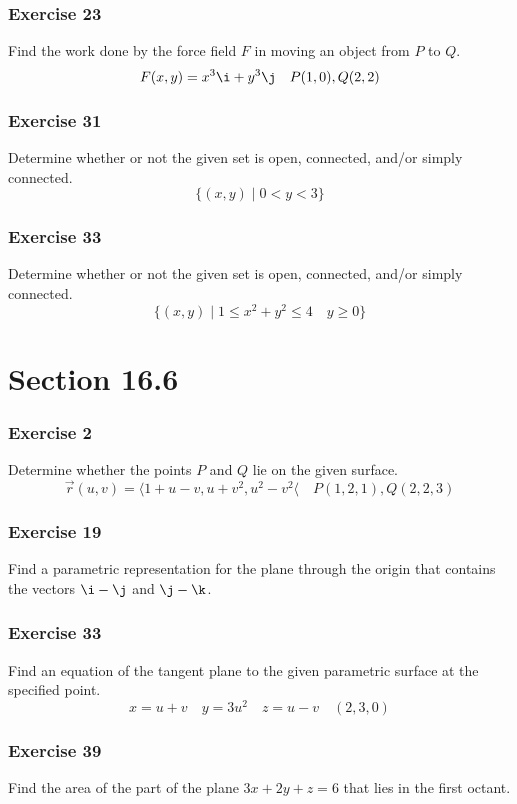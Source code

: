 \documentclass{math}
\begin{document}
\subsubsection*{Exercise 23}
Find the work done by the force field \( F \) in moving an object from \( P \)
to \( Q \).
\[ F(x,y) = x^3\i+y^3\j \quad P(1,0),Q(2,2) \]

\subsubsection*{Exercise 31}
Determine whether or not the given set is open, connected, and/or simply
connected.
\[ \{(x,y)\mid0<y<3\} \]

\subsubsection*{Exercise 33}
Determine whether or not the given set is open, connected, and/or simply
connected.
\[ \{(x,y)\mid1\le x^2+y^2\le 4\quad y\ge0\} \]

\section*{Section 16.6}

\subsubsection*{Exercise 2}
Determine whether the points \( P \) and \( Q \) lie on the given surface.
\[ \vec{r}(u,v) = \langle1+u-v,u+v^2,u^2-v^2\langle \quad P(1,2,1),Q(2,2,3) \]

\subsubsection*{Exercise 19}
Find a parametric representation for the plane through the origin that contains
the vectors \( \i-\j \) and \( \j-\k \).

\subsubsection*{Exercise 33}
Find an equation of the tangent plane to the given parametric surface at the
specified point.
\[ x = u+v \quad y = 3u^2 \quad z = u-v \quad (2,3,0) \]

\subsubsection*{Exercise 39}
Find the area of the part of the plane \( 3x+2y+z = 6 \) that lies in the first
octant.
\end{document}
